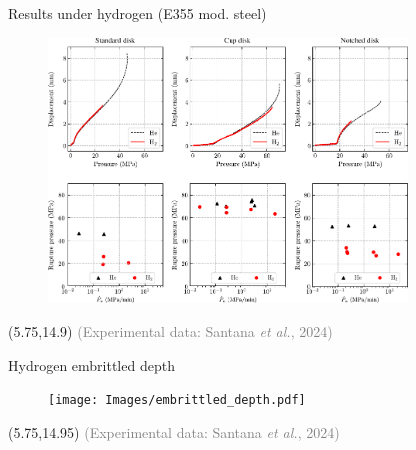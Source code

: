 \documentclass[9pt]{beamer}
\begin{document}
\begin{frame}{Results under hydrogen (E355 mod. steel)}

\begin{figure}
	\centering
	\includegraphics[width=0.85\textwidth]{Images/H2_results_E355.pdf} \\
\end{figure}

    \begin{textblock}{6}(5.75,14.9)
        \textcolor{gray}{\scriptsize (Experimental data: Santana \textit{et al.}, 2024)}
    \end{textblock}

\end{frame}


\begin{frame}{Hydrogen embrittled depth}

\begin{figure}
	\centering
	\texttt{[image: Images/embrittled\_depth.pdf]} \\
\end{figure}

    \begin{textblock}{6}(5.75,14.95)
        \textcolor{gray}{\scriptsize (Experimental data: Santana \textit{et al.}, 2024)}
    \end{textblock}

\end{frame}

\end{document}
